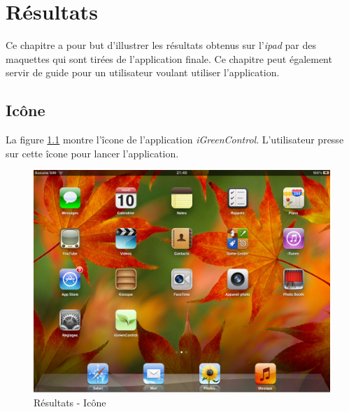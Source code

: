 
\chapter{Résultats} %
\label{cha:r_sultats}
Ce chapitre a pour but d'illustrer les résultats obtenus sur l'\emph{\gls{ipad}} par des maquettes qui sont tirées de l'application finale. Ce chapitre peut également servir de guide pour un utilisateur voulant utiliser l'application.

\section{Icône} %
\label{sec:ic_ne}
La figure \ref{gra:res01} montre l'îcone de l'application \emph{iGreenControl}. L'utilisateur presse sur cette îcone pour lancer l'application.
\begin{figure}[H]
     	\centering
     	\includegraphics[width=14cm]{00_media/07_01.PNG}
     	\caption{Résultats - Icône}
     	\label{gra:res01}
 \end{figure} 

\clearpage


